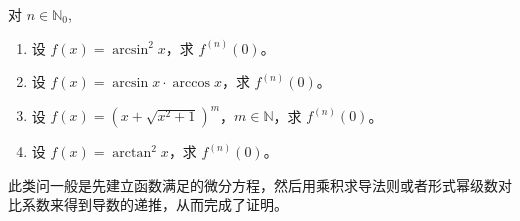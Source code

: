 \documentclass[../../main.tex]{subfiles}
\begin{document}
\begin{example}[生成级数或者建立递推法求解高阶导数值]
对 \( n \in \mathbb{N}_0 \),
\begin{enumerate}[(1)]
\item 设 \( f(x) = \arcsin^2 x \)，求 \( f^{(n)}(0) \)。

\item 设 \( f(x) = \arcsin x \cdot \arccos x \)，求 \( f^{(n)}(0) \)。

\item 设 \( f(x) = (x + \sqrt{x^2 + 1})^m \)，\( m \in \mathbb{N} \)，求 \( f^{(n)}(0) \)。

\item 设 \( f(x) = \arctan^2 x \)，求 \( f^{(n)}(0) \)。
\end{enumerate}
\end{example}
\begin{note}
此类问一般是先建立函数满足的微分方程，然后用乘积求导法则或者形式幂级数对比系数来得到导数的递推，从而完成了证明。
\end{note}
\end{document}
